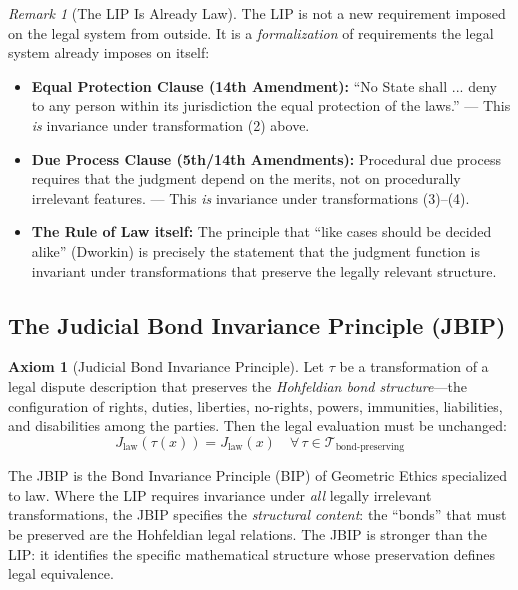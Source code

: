 \documentclass[12pt]{article}
\theoremstyle{definition}
\newtheorem{axiom}{Axiom}
\theoremstyle{remark}
\newtheorem{remark}[theorem]{Remark}
\begin{document}
\begin{remark}[The LIP Is Already Law]
The LIP is not a new requirement imposed on the legal system from outside.  It is a \emph{formalization} of requirements the legal system already imposes on itself:
\begin{itemize}
    \item \textbf{Equal Protection Clause (14th Amendment):} ``No State shall ... deny to any person within its jurisdiction the equal protection of the laws.'' --- This \emph{is} invariance under transformation (2) above.
    \item \textbf{Due Process Clause (5th/14th Amendments):} Procedural due process requires that the judgment depend on the merits, not on procedurally irrelevant features. --- This \emph{is} invariance under transformations (3)--(4).
    \item \textbf{The Rule of Law itself:} The principle that ``like cases should be decided alike'' (Dworkin) is precisely the statement that the judgment function is invariant under transformations that preserve the legally relevant structure.
\end{itemize}
\end{remark}

\subsection{The Judicial Bond Invariance Principle (JBIP)}

\begin{axiom}[Judicial Bond Invariance Principle]
\label{axiom:jbip}
Let $\tau$ be a transformation of a legal dispute description that preserves the \emph{Hohfeldian bond structure}---the configuration of rights, duties, liberties, no-rights, powers, immunities, liabilities, and disabilities among the parties.  Then the legal evaluation must be unchanged:
\begin{equation}
J_{\text{law}}(\tau(x)) = J_{\text{law}}(x) \quad \forall\, \tau \in \mathcal{T}_{\text{bond-preserving}}
\label{eq:jbip}
\end{equation}
\end{axiom}

The JBIP is the Bond Invariance Principle (BIP) of Geometric Ethics \cite{bond2026geometric} specialized to law.  Where the LIP requires invariance under \emph{all} legally irrelevant transformations, the JBIP specifies the \emph{structural content}: the ``bonds'' that must be preserved are the Hohfeldian legal relations.  The JBIP is stronger than the LIP: it identifies the specific mathematical structure whose preservation defines legal equivalence.
\end{document}
